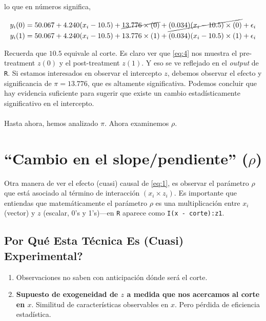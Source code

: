 \documentclass[10pt]{article}
\begin{document}
lo que en n\'umeros significa,

\begin{equation} \label{eq:4}
\begin{split}
y_{i}(0) &= 50.067 + 4.240(x_{i}-10.5) + \cancel{13.776\times(0)} + \cancel{(0.034)(x_{i}-10.5) \times (0)} +  \epsilon_{i} \\
y_{i}(1) &= 50.067 + 4.240(x_{i}-10.5) + 13.776\times(1) + (0.034)(x_{i}-10.5) \times (1) +  \epsilon_{i}
\end{split}
\end{equation}


Recuerda que $10.5$ equivale al corte. Es claro ver que \autoref{eq:4} nos muestra el pre-treatment $z(0)$ y el post-treatment $z(1)$. Y eso se ve reflejado en el \emph{output} de \texttt{R}. Si estamos interesados en observar el intercepto $z$, debemos observar el efecto y significancia de $\pi=13.776$, que es altamente significativa. Podemos concluir que hay evidencia suficiente para sugerir que existe un cambio estad\'isticamente significativo en el intercepto.
\\
\\
Hasta ahora, hemos analizado $\pi$. Ahora examinemos $\rho$.


\section*{``Cambio en el slope/pendiente'' ($\rho$)}

Otra manera de ver el efecto (cuasi) causal de \autoref{eq:1}, es observar el par\'ametro $\rho$ que est\'a asociado al t\'ermino de interacci\'on $(x_{i}\times z_{i})$. Es importante que entiendas que matem\'aticamente el par\'ametro  $\rho$ es una multiplicaci\'on entre $x_{i}$ (vector) y $z$ (escalar, 0's y 1's)---en \texttt{R} aparece como \texttt{I(x - corte):z1}.


\subsection*{Por Qu\'e Esta T\'ecnica Es (Cuasi) Experimental?}

\begin{enumerate}
	\item Observaciones no saben con anticipaci\'on d\'onde ser\'a el corte.
	\item {\bf Supuesto de exogeneidad de $z$ a medida que nos acercamos al corte en $x$}.  Similitud de caracter\'isticas observables en $x$. Pero p\'erdida de eficiencia estad\'istica.
\end{enumerate}
\end{document}
